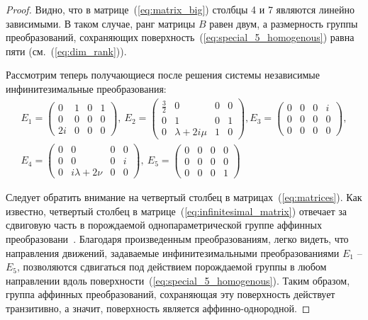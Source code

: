 \documentclass[../main.tex]{subfiles}
\begin{document}
\begin{proof}
Видно, что в матрице~(\ref{eq:matrix_big}) столбцы 4 и 7 являются линейно зависимыми. В таком случае, ранг матрицы $B$ равен двум, а размерность группы преобразований, сохраняющих поверхность~(\ref{eq:special_5_homogenous}) равна пяти (см.~(\ref{eq:dim_rank})).

Рассмотрим теперь получающиеся после решения системы независимые инфинитезимальные преобразования:
\begin{equation}\label{eq:matrices} 
\begin{gathered}
E_1 = \left(
\begin{array}{cccc}
 0 & 1 & 0 & 1 \\
 0 & 0 & 0 & 0 \\
 2i & 0 & 0 & 0 
\end{array}
\right),~
E_2 = \left(
\begin{array}{cccc}
 \frac{3}{2} & 0 & 0 & 0 \\
 0 & 1 & 0 & 1 \\
 0 & \lambda +2 i \mu & 1 & 0 
\end{array}
\right),
E_3 = \left(
\begin{array}{cccc}
 0 & 0 & 0 & i \\
 0 & 0 & 0 & 0 \\
 0 & 0 & 0 & 0 
\end{array}
\right),\\
E_4 = \left(
\begin{array}{cccc}
 0 & 0 & 0 & 0 \\
 0 & 0 & 0 & i \\
 0 & i \lambda +2 \nu  & 0 & 0 
\end{array}
\right),~
E_5 = \left(
\begin{array}{cccc}
 0 & 0 & 0 & 0 \\
 0 & 0 & 0 & 0 \\
 0 & 0 & 0 & 1 
\end{array}
\right)
\end{gathered}
\end{equation}

Следует обратить внимание на четвертый столбец в матрицах~(\ref{eq:matrices}). Как известно, четвертый столбец в матрице~(\ref{eq:infinitesimal_matrix}) отвечает за сдвиговую часть в порождаемой однопараметрической группе аффинных преобразовани~\cite{lie}. Благодаря произведенным преобразованиям, легко видеть, что направления движений, задаваемые инфинитезимальными преобразованиями $E_1$ -- $E_5$, позволяются сдвигаться под действием порождаемой группы в любом направлении вдоль поверхности~(\ref{eq:special_5_homogenous}). Таким образом, группа аффинных преобразований, сохраняющая эту поверхность действует транзитивно, а значит, поверхность является аффинно-однородной.

\end{proof}
\end{document}
